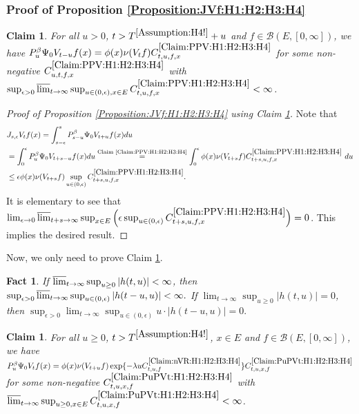 \documentclass[12pt,a4paper]{amsart}
\numberwithin{equation}{section}
\theoremstyle{plain}
\newtheorem{fact}[thm]{Fact}
\newtheorem{claim}[thm]{Claim}
\theoremstyle{definition}
\theoremstyle{remark}
\newcounter{N}
\newcounter{n}[N]
\begin{document}
\subsubsection{Proof of Proposition \ref{Proposition:JVf:H1:H2:H3:H4}} \label{sec:JVf}
\begin{claim} \label{Claim:PPV:H1:H2:H3:H4}
For all $u>0$, $t> T^{\ref{Assumption:H4!}} + u$ and $f \in \mathcal B(E,[0,\infty])$, we have
$P_u^\beta \Psi_0 V_{t-u} f(x)
 = \phi(x)\nu(V_tf) C^{\ref{Claim:PPV:H1:H2:H3:H4}}_{t,u,f,x}$
 for some non-negative $C^{\ref{Claim:PPV:H1:H2:H3:H4}}_{u,t,f,x}$ with $\sup_{\epsilon > 0} \varlimsup_{t\to \infty} \sup_{u \in (0,\epsilon), x\in E} C^{\ref{Claim:PPV:H1:H2:H3:H4}}_{t,u,f,x} < \infty$.
\end{claim}
\begin{proof}[{Proof of Proposition \ref{Proposition:JVf:H1:H2:H3:H4} using Claim \ref{Claim:PPV:H1:H2:H3:H4}}]
Note that
\begin{align}
 &J_{s,\epsilon}V_tf(x)
 = \int_{s-\epsilon}^s P_{s-u}^\beta \Psi_0 V_{t+u} f(x)du
 \\&= \int_0^\epsilon P_u^\beta \Psi_0 V_{t+s - u}f(x) du
 \overset{\text{Claim \ref{Claim:PPV:H1:H2:H3:H4}}}= \int_0^\epsilon \phi(x) \nu(V_{t+s}f) C^{\ref{Claim:PPV:H1:H2:H3:H4}}_{t+s,u,f,x}~du
 \\&\leq \epsilon \phi(x)\nu(V_{t+s}f) \sup_{u\in (0,\epsilon)} C^{\ref{Claim:PPV:H1:H2:H3:H4}}_{t+s,u,f,x}.
 \end{align}
 It is elementary to see that $\lim_{\epsilon \to 0}\varlimsup_{t+s \to \infty}\sup_{x\in E}\Big(\epsilon \sup_{u\in (0,\epsilon)} C^{\ref{Claim:PPV:H1:H2:H3:H4}}_{t+s,u,f,x}\Big) = 0$.
This implies the desired result.
\end{proof}
Now, we only need to prove Claim \ref{Claim:PPV:H1:H2:H3:H4}.
\begin{fact} \label{Fact:TO!}
If $\varlimsup_{t\to \infty} \sup_{u\geq 0} |h(t,u)| < \infty$, then $\sup_{\epsilon > 0} \varlimsup_{t\to \infty} \sup_{u \in (0,\epsilon)} |h(t-u,u)| < \infty.$
If $\lim_{t\to \infty} \sup_{u \geq 0} |h(t,u)| = 0$, then
$
 \sup_{\epsilon > 0} \lim_{t\to \infty} \sup_{u \in (0,\epsilon)} u\cdot |h(t-u,u)| = 0.
$
\end{fact}
\begin{claim} \label{Claim:PuPVt:H1:H2:H3:H4}
For all $u\geq 0$, $t>T^{\ref{Assumption:H4!}}$, $x\in E$ and $f\in \mathcal B(E,[0,\infty])$, we have
$
 P_u^\beta \Psi_0 V_{t} f(x)
 = \phi(x)\nu(V_{t+u}f) \exp\{-\lambda u C^{\ref{Claim:nVR:H1:H2:H3:H4}}_{t,u,f} \} C^{\ref{Claim:PuPVt:H1:H2:H3:H4}}_{t,u,x,f}
 $
 for some non-negative $C^{\ref{Claim:PuPVt:H1:H2:H3:H4}}_{t,u,x,f}$ with $\varlimsup_{t\to \infty} \sup_{u\geq 0, x\in E} C^{\ref{Claim:PuPVt:H1:H2:H3:H4}}_{t,u,x,f} < \infty$.
\end{claim}
\end{document}
